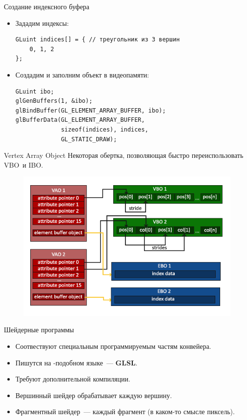 \documentclass[aspectration=1610,t]{beamer}
\begin{document}
\begin{frame}[fragile]{Создание индексного буфера}
    \begin{itemize}
        \item Зададим индексы:
            {\small \begin{lstlisting}
GLuint indices[] = { // треугольник из 3 вершин
    0, 1, 2
};
            \end{lstlisting}}
        \item Создадим и заполним объект в видеопамяти:
            {\small \begin{lstlisting}
GLuint ibo;
glGenBuffers(1, &ibo);
glBindBuffer(GL_ELEMENT_ARRAY_BUFFER, ibo);
glBufferData(GL_ELEMENT_ARRAY_BUFFER,
             sizeof(indices), indices,
             GL_STATIC_DRAW);
            \end{lstlisting}}
    \end{itemize}
\end{frame}

\begin{frame}[fragile]{Vertex Array Object}
    Некоторая обертка, позволяющая быстро переиспользовать VBO~и IBO.
    \begin{figure}[htp]
        \centering
        \includegraphics[scale=0.40]{res/vao}
    \end{figure}
\end{frame}

\begin{frame}[fragile]{Шейдерные программы}
    \begin{itemize}
        \item Соотвествуют специальным программируемым частям конвейера.
        \item Пишутся на \langc-подобном языке~--- {\bf GLSL}.
        \item Требуют дополнительной компиляции.
        \item Вершинный шейдер обрабатывает каждую вершину.
        \item Фрагментный шейдер~--- каждый фрагмент (в каком-то смысле пиксель).
    \end{itemize}
\end{frame}
\end{document}

